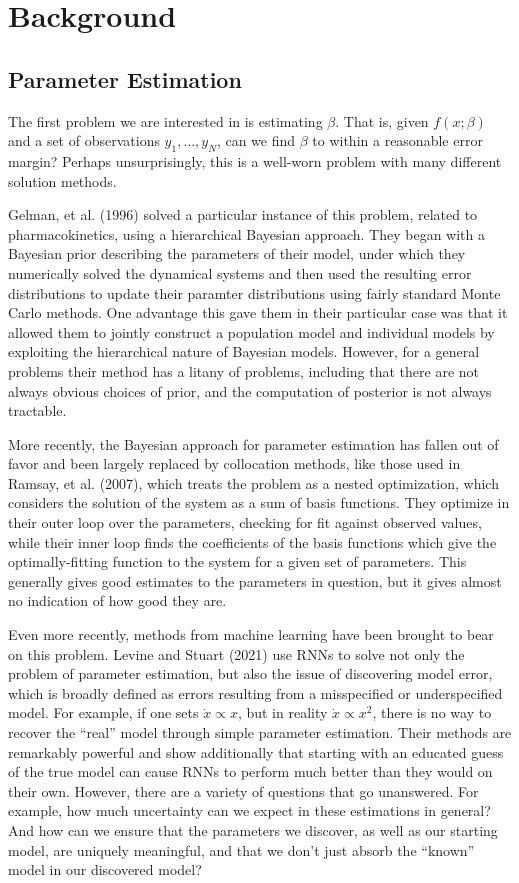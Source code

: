 \documentclass[12pt]{article}
\begin{document}
\section{Background}

\subsection{Parameter Estimation}

The first problem we are interested in is estimating $\beta$. That is, given $f(x;\beta)$ and a set of observations $y_1, \ldots, y_N$, can we find $\beta$ to within a reasonable error margin? Perhaps unsurprisingly, this is a well-worn problem with many different solution methods.

Gelman, et al. (1996) solved a particular instance of this problem, related to pharmacokinetics, using a hierarchical Bayesian approach. They began with a Bayesian prior describing the parameters of their model, under which they numerically solved the dynamical systems and then used the resulting error distributions to update their paramter distributions using fairly standard Monte Carlo methods. One advantage this gave them in their particular case was that it allowed them to jointly construct a population model and individual models by exploiting the hierarchical nature of Bayesian models.\cite{gelman} However, for a general problems their method has a litany of problems, including that there are not always obvious choices of prior, and the computation of posterior is not always tractable.

More recently, the Bayesian approach for parameter estimation has fallen out of favor and been largely replaced by collocation methods, like those used in Ramsay, et al. (2007), which treats the problem as a nested optimization, which considers the solution of the system as a sum of basis functions. They optimize in their outer loop over the parameters, checking for fit against observed values, while their inner loop finds the coefficients of the basis functions which give the optimally-fitting function to the system for a given set of parameters.\cite{ramsay} This generally gives good estimates to the parameters in question, but it gives almost no indication of how good they are.

Even more recently, methods from machine learning have been brought to bear on this problem. Levine and Stuart (2021) use RNNs to solve not only the problem of parameter estimation, but also the issue of discovering model error, which is broadly defined as errors resulting from a misspecified or underspecified model. For example, if one sets $\dot{x} \propto x$, but in reality $\dot{x} \propto x^2$, there is no way to recover the ``real'' model through simple parameter estimation. Their methods are remarkably powerful and show additionally that starting with an educated guess of the true model can cause RNNs to perform much better than they would on their own. However, there are a variety of questions that go unanswered. For example, how much uncertainty can we expect in these estimations in general? And how can we ensure that the parameters we discover, as well as our starting model, are uniquely meaningful, and that we don't just absorb the ``known'' model in our discovered model?
\end{document}
